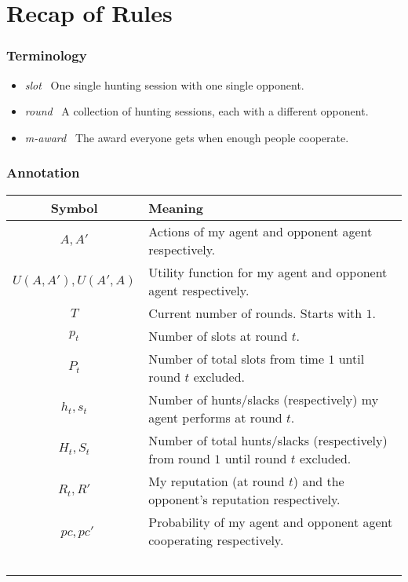 \documentclass[10pt,fleqn]{article}
\begin{document}
\section{Recap of Rules}

\subsubsection{Terminology}
\begin{itemize}
  \item \emph{slot} \dash\ One single hunting session with one single opponent.
  \item \emph{round} \dash\ A collection of hunting sessions, each with a
    different opponent.
  \item \emph{m-award} \dash\ The award everyone gets when enough people
    cooperate.
\end{itemize}

\subsubsection{Annotation}

\begin{tabular*}{\textwidth}{cl}
  \toprule
  Symbol & Meaning \\
  \midrule
  $A, A'$ & Actions of my agent and opponent agent respectively. \\
  \midrule
  $U(A, A'), U(A', A)$ & Utility function for my agent and opponent agent
  respectively. \\
  \midrule
  $T$ & Current number of rounds. Starts with $1$. \\
  \midrule
  $p_t$ & Number of slots at round $t$. \\
  \midrule
  $P_t$ & Number of total slots from time $1$ until round $t$ excluded. \\
  \midrule
  $h_t, s_t$ & Number of hunts/slacks (respectively) my agent performs at round
  $t$. \\
  \midrule
  $H_t, S_t$ & Number of total hunts/slacks (respectively) from round $1$ until
  round $t$ excluded. \\
  \midrule
  $R_t, R'$ & My reputation (at round $t$) and the opponent's reputation
  respectively. \\
  \midrule\
  $pc, pc'$ & Probability of my agent and opponent agent cooperating
  respectively. \\
  \bottomrule\
\end{tabular*}
\end{document}
